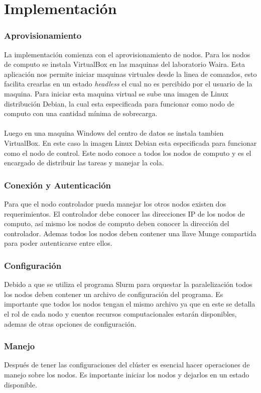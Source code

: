 \section{Implementación}
\subsubsection{Aprovisionamiento}
La implementación comienza con el aprovisionamiento de nodos. Para los nodos de computo se instala VirtualBox en las maquinas del laboratorio Waira. Esta aplicación nos permite iniciar maquinas virtuales desde la linea de comandos, esto facilita crearlas en un estado \textit{headless} el cual no es percibido por el usuario de la maquina. Para iniciar esta maquina virtual se sube una imagen de Linux distribución Debian, la cual esta especificada para funcionar como nodo de computo con una cantidad mínima de sobrecarga.
\\
\\
Luego en una maquina Windows del centro de datos se instala tambien VirtualBox. En este caso la imagen Linux Debian esta especificada para funcionar como el nodo de control. Este nodo conoce a todos los nodos de computo y es el encargado de distribuir las tareas y manejar la cola.

\subsubsection{Conexión y Autenticación}
Para que el nodo controlador pueda manejar los otros nodos existen dos requerimientos. El controlador debe conocer las direcciones IP de los nodos de computo, así mismo los nodos de computo deben conocer la dirección del controlador. Ademas todos los nodos deben contener una llave Munge compartida para poder autenticarse entre ellos.

\subsubsection{Configuración}
Debido a que se utiliza el programa Slurm para orquestar la paralelización todos los nodos deben contener un archivo de configuración del programa. Es importante que todos los nodos tengan el mismo archivo ya que en este se detalla el rol de cada nodo y cuentos recursos computacionales estarán disponibles, ademas de otras opciones de configuración.

\subsubsection{Manejo}
Después de tener las configuraciones del clúster es esencial hacer operaciones de manejo sobre los nodos. Es importante iniciar los nodos y dejarlos en un estado disponible.

